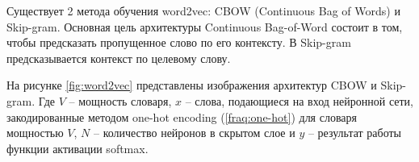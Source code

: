 \documentclass[a4paper,14pt]{article}
\begin{document}
Существует 2 метода обучения word2vec: CBOW (Continuous Bag of Words) и  Skip-gram.
Основная цель архитектуры Continuous Bag-of-Word состоит в том, чтобы предсказать пропущенное слово по его контексту.
В Skip-gram предсказывается контекст по целевому слову.

На рисунке \ref{fig:word2vec} представлены изображения архитектур CBOW и Skip-gram.
Где $V$ -- мощность словаря, $x$ -- слова, подающиеся на вход нейронной сети, закодированные методом one-hot encoding (\ref{fraq:one-hot}) для словаря мощностью $V$, $N$ -- количество нейронов в скрытом слое и $y$ -- результат работы функции активации softmax.
\end{document}
